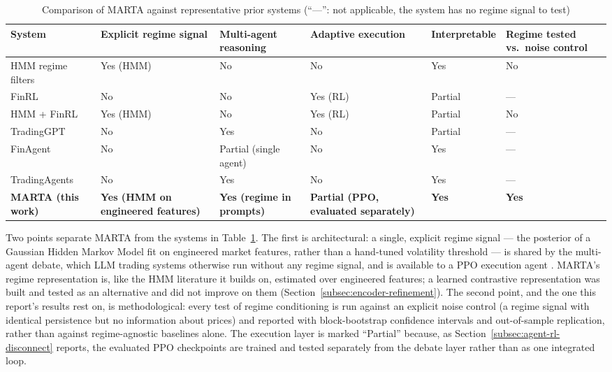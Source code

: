 \begin{table}[H]
\centering
\small
\footnotesize
\setlength{\tabcolsep}{3pt}
\caption{Comparison of MARTA against representative prior systems (``---'': not applicable, the system has no regime signal to test)}
\label{tab:gap-comparison}
\begin{tabular}{|>{\raggedright\arraybackslash}p{2.4cm}|>{\centering\arraybackslash}p{2.3cm}|>{\centering\arraybackslash}p{2.3cm}|>{\centering\arraybackslash}p{2.3cm}|>{\centering\arraybackslash}p{2.4cm}|>{\centering\arraybackslash}p{2.2cm}|}
\hline
\textbf{System} & \textbf{Explicit regime signal} & \textbf{Multi-agent reasoning} & \textbf{Adaptive execution} & \textbf{Interpretable} & \textbf{Regime tested vs.\ noise control} \\
\hline
HMM regime filters \cite{hamilton1989,angbekaert2002} & Yes (HMM) & No & No & Yes & No \\
\hline
FinRL \cite{finrl2020} & No & No & Yes (RL) & Partial & --- \\
\hline
HMM + FinRL \cite{hmm-finrl-2025} & Yes (HMM) & No & Yes (RL) & Partial & No \\
\hline
TradingGPT \cite{tradinggpt2023} & No & Yes & No & Partial & --- \\
\hline
FinAgent \cite{finagent2024} & No & Partial (single agent) & No & Yes & --- \\
\hline
TradingAgents \cite{tradingagents2024} & No & Yes & No & Yes & --- \\
\hline
\textbf{MARTA (this work)} & \textbf{Yes (HMM on engineered features)} & \textbf{Yes (regime in prompts)} & \textbf{Partial (PPO, evaluated separately)} & \textbf{Yes} & \textbf{Yes} \\
\hline
\end{tabular}
\normalsize
\end{table}

Two points separate MARTA from the systems in Table~\ref{tab:gap-comparison}. The first is architectural: a single, explicit regime signal --- the posterior of a Gaussian Hidden Markov Model fit on engineered market features, rather than a hand-tuned volatility threshold --- is shared by the multi-agent debate, which LLM trading systems otherwise run without any regime signal, and is available to a PPO execution agent \cite{ppo2017}. MARTA's regime representation is, like the HMM literature it builds on, estimated over engineered features; a learned contrastive representation was built and tested as an alternative and did not improve on them (Section~\ref{subsec:encoder-refinement}). The second point, and the one this report's results rest on, is methodological: every test of regime conditioning is run against an explicit noise control (a regime signal with identical persistence but no information about prices) and reported with block-bootstrap confidence intervals and out-of-sample replication, rather than against regime-agnostic baselines alone. The execution layer is marked ``Partial'' because, as Section~\ref{subsec:agent-rl-disconnect} reports, the evaluated PPO checkpoints are trained and tested separately from the debate layer rather than as one integrated loop.

